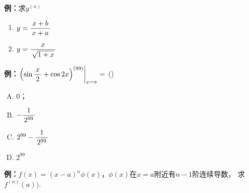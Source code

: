 {\bf 例：}求$y^{(n)}$
\begin{enumerate}[(1)]
  \setlength{\itemindent}{1cm}
  \item $y=\displaystyle\frac{\,{x+b}\,}{\,{x+a}\,}$
  \item $y=\displaystyle\frac{\,{x}\,}{\,{\sqrt{1+x}}\,}$
\end{enumerate}

{\bf 例：}$\left.\left(\sin\displaystyle\frac{\,{x}\,}{\,{2}\,}+\cos2x\right)^{(99)}\right|_{x=\pi}=$
(\underline{\hspace{2cm}})
\begin{enumerate}[(A)]
  \setlength{\itemindent}{1cm}
  \item $0$；
  \item $-\displaystyle\frac{\,{1}\,}{\,{2^{99}}\,}$
  \item $2^{99}-\displaystyle\frac{\,{1}\,}{\,{2^{99}}\,}$
  \item $2^{99}$
\end{enumerate}

{\bf 例：}$f(x)=(x-a)^n\phi(x)$，$\phi(x)$在$x=a$附近有$n-1$阶连续导数，
求$f^{(n)}(a))$.
